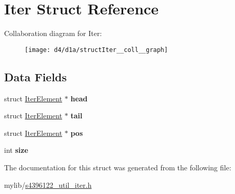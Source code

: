 \hypertarget{structIter}{}\section{Iter Struct Reference}
\label{structIter}


Collaboration diagram for Iter\+:\nopagebreak
\begin{figure}[H]
\begin{center}
\leavevmode
\texttt{[image: d4/d1a/structIter\_\_coll\_\_graph]}
\end{center}
\end{figure}
\subsection*{Data Fields}
\begin{DoxyCompactItemize}
\item 
struct \hyperlink{structIterElement}{Iter\+Element} $\ast$ {\bfseries head}\hypertarget{structIter_a26a7f90d8def244d1f7b1241f8e8c1c0}{}\label{structIter_a26a7f90d8def244d1f7b1241f8e8c1c0}

\item 
struct \hyperlink{structIterElement}{Iter\+Element} $\ast$ {\bfseries tail}\hypertarget{structIter_a1e9f93f8ba788cae0d795f1ee40eb02c}{}\label{structIter_a1e9f93f8ba788cae0d795f1ee40eb02c}

\item 
struct \hyperlink{structIterElement}{Iter\+Element} $\ast$ {\bfseries pos}\hypertarget{structIter_aae309130f774938436936eb313320362}{}\label{structIter_aae309130f774938436936eb313320362}

\item 
int {\bfseries size}\hypertarget{structIter_aa6d3865af1aa7c8e39ebb73ac5866d9f}{}\label{structIter_aa6d3865af1aa7c8e39ebb73ac5866d9f}

\end{DoxyCompactItemize}


The documentation for this struct was generated from the following file\+:\begin{DoxyCompactItemize}
\item 
mylib/\hyperlink{s4396122__util__iter_8h}{s4396122\+\_\+util\+\_\+iter.\+h}\end{DoxyCompactItemize}
